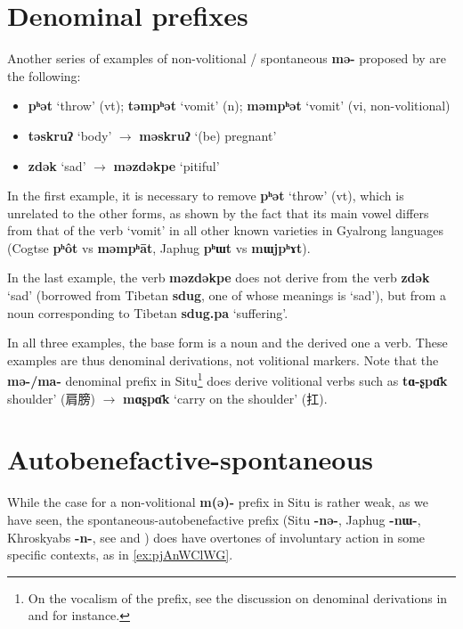 \documentclass[oneside,a4paper,11pt]{article}
\newcommand{\ipa}[1]{\textbf{{\phon\mbox{#1}}}} %
\newcommand{\zh}[1]{{\cn #1}}
\begin{document}
\section{Denominal prefixes}
Another series of examples of non-volitional / spontaneous \ipa{mə-} proposed by \citet[506]{prins16kyomkyo}  are the following:

\begin{itemize}
\item \ipa{pʰət} `throw' (vt); \ipa{təmpʰət} `vomit' (n); \ipa{məmpʰət} `vomit' (vi, non-volitional)
\item \ipa{təskruʔ} `body' $\rightarrow$ \ipa{məskruʔ} `(be) pregnant'
\item \ipa{zdək} `sad' $\rightarrow$ \ipa{məzdəkpe} `pitiful'
\end{itemize}

In the first example, it is necessary to remove \ipa{pʰət} `throw' (vt), which is unrelated to the other forms, as shown by the fact that its main vowel differs from that of the verb `vomit' in all other known varieties in Gyalrong languages (Cogtse \ipa{pʰôt} vs \ipa{məmpʰāt}, Japhug \ipa{pʰɯt} vs \ipa{mɯjpʰɤt}).

In the last example, the verb \ipa{məzdəkpe} does not derive from the verb \ipa{zdək} `sad' (borrowed from Tibetan \ipa{sdug}, one of whose meanings is `sad'), but from a noun corresponding to Tibetan \ipa{sdug.pa} `suffering'.

In all three examples, the base form is a noun and the derived one a verb. These examples are thus denominal derivations, not volitional markers. Note that the \ipa{mə-/ma-} denominal prefix in Situ\footnote{On the vocalism of the prefix, see the discussion on denominal derivations in \citet{jackson98morphology} and \citet{linxr93jiarong} for instance.} does derive volitional verbs such as \ipa{tɑ-ʂpɑ̄k}  shoulder'  (\zh{肩膀}) $\rightarrow$ \ipa{mɑʂpɑ̄k} `carry on the shoulder' (\zh{扛}).


\section{Autobenefactive-spontaneous}
While the case for a non-volitional \ipa{m(ə)-} prefix in Situ is rather weak, as we have seen, the spontaneous-autobenefactive prefix (Situ \ipa{-nə-}, Japhug \ipa{-nɯ-}, Khroskyabs \ipa{-n-}, see  \citealt{jacques15spontaneous} and  \citealt[158-160]{lai13affixale}) does have overtones of involuntary action in some specific contexts, as in \ref{ex:pjAnWClWG}. 
\end{document}
